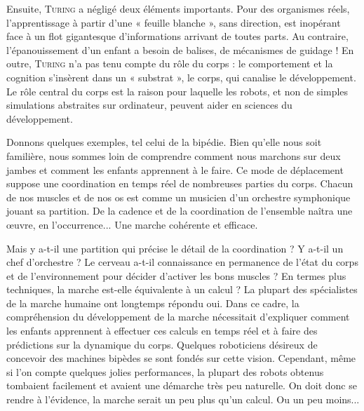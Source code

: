 Ensuite, \textsc{Turing} a négligé deux éléments importants. Pour des organismes réels, l’apprentissage à partir d’une « feuille blanche », sans direction, est inopérant face à un flot gigantesque d’informations arrivant de toutes parts. Au contraire, l’épanouissement d’un enfant a besoin de balises, de mécanismes de guidage ! En outre, \textsc{Turing} n’a pas tenu compte du rôle du corps : le comportement et la cognition s’insèrent dans un « substrat », le corps, qui canalise le développement. Le rôle central du corps est la raison pour laquelle les robots, et non de simples simulations abstraites sur ordinateur, peuvent aider en sciences du développement.


Donnons quelques exemples, tel celui de la bipédie. Bien qu’elle nous soit familière, nous sommes loin de comprendre comment nous marchons sur deux jambes et comment les enfants apprennent à le faire. Ce mode de déplacement suppose une coordination en temps réel de nombreuses parties du corps. Chacun de nos muscles et de nos os est comme un musicien d’un orchestre symphonique jouant sa partition. De la cadence et de la coordination de l’ensemble naîtra une œuvre, en l’occurrence... Une marche cohérente et efficace.

Mais y a-t-il une partition qui précise le détail de la coordination ? Y a-t-il un chef d’orchestre ? Le cerveau a-t-il connaissance en permanence de l’état du corps et de l’environnement pour décider d’activer les bons muscles ? En termes plus techniques, la marche est-elle équivalente à un calcul ? La plupart des spécialistes de la marche humaine ont longtemps répondu oui. Dans ce cadre, la compréhension du développement de la marche nécessitait d’expliquer comment les enfants apprennent à effectuer ces calculs en temps réel et à faire des prédictions sur la dynamique du corps. Quelques roboticiens désireux de concevoir des machines bipèdes se sont fondés sur cette vision. Cependant, même si l’on compte quelques jolies performances, la plupart des robots obtenus tombaient facilement et avaient une démarche très peu naturelle. On doit donc se rendre à l’évidence, la marche serait un peu plus qu’un calcul. Ou un peu moins...

